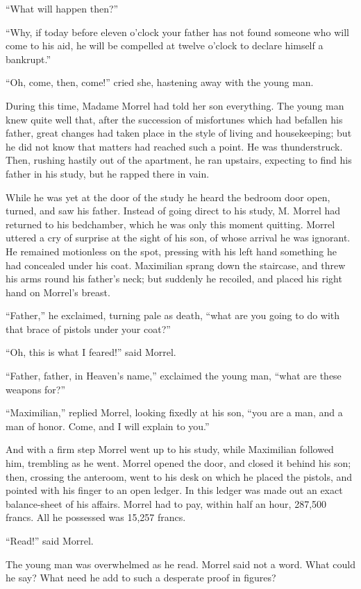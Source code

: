 “What will happen then?”

“Why, if today before eleven o’clock your father has not found someone
who will come to his aid, he will be compelled at twelve o’clock to
declare himself a bankrupt.”

“Oh, come, then, come!” cried she, hastening away with the young man.

During this time, Madame Morrel had told her son everything. The young
man knew quite well that, after the succession of misfortunes which had
befallen his father, great changes had taken place in the style of
living and housekeeping; but he did not know that matters had reached
such a point. He was thunderstruck. Then, rushing hastily out of the
apartment, he ran upstairs, expecting to find his father in his study,
but he rapped there in vain.

While he was yet at the door of the study he heard the bedroom door
open, turned, and saw his father. Instead of going direct to his study,
M. Morrel had returned to his bedchamber, which he was only this moment
quitting. Morrel uttered a cry of surprise at the sight of his son, of
whose arrival he was ignorant. He remained motionless on the spot,
pressing with his left hand something he had concealed under his coat.
Maximilian sprang down the staircase, and threw his arms round his
father’s neck; but suddenly he recoiled, and placed his right hand on
Morrel’s breast.

“Father,” he exclaimed, turning pale as death, “what are you going to
do with that brace of pistols under your coat?”

“Oh, this is what I feared!” said Morrel.

“Father, father, in Heaven’s name,” exclaimed the young man, “what are
these weapons for?”

“Maximilian,” replied Morrel, looking fixedly at his son, “you are a
man, and a man of honor. Come, and I will explain to you.”

And with a firm step Morrel went up to his study, while Maximilian
followed him, trembling as he went. Morrel opened the door, and closed
it behind his son; then, crossing the anteroom, went to his desk on
which he placed the pistols, and pointed with his finger to an open
ledger. In this ledger was made out an exact balance-sheet of his
affairs. Morrel had to pay, within half an hour, 287,500 francs. All he
possessed was 15,257 francs.

“Read!” said Morrel.

The young man was overwhelmed as he read. Morrel said not a word. What
could he say? What need he add to such a desperate proof in figures?

